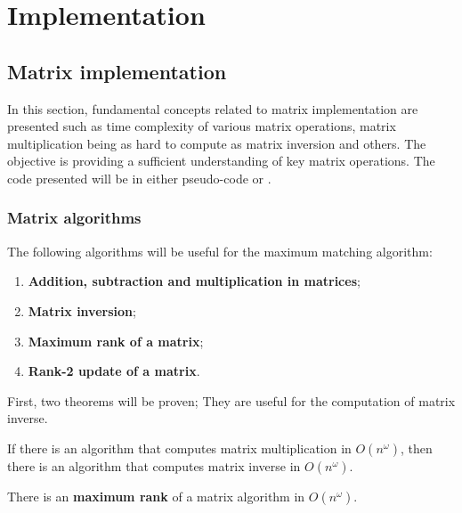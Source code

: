 \chapter{Implementation}

\section{Matrix implementation}

In this section, fundamental concepts related to matrix implementation are presented such as time complexity of various matrix operations,
matrix multiplication being as hard to compute as matrix inversion and others.
The objective is providing a sufficient understanding of key matrix operations.
The code presented will be in either pseudo-code or .

\subsection{Matrix algorithms}

The following algorithms will be useful for the maximum matching algorithm: 
\begin{enumerate}
    \item \textbf{Addition, subtraction and multiplication in matrices};
    \item \textbf{Matrix inversion};
    \item \textbf{Maximum rank of a matrix};
    \item \textbf{Rank-2 update of a matrix}.
\end{enumerate}

First, two theorems will be proven; They are useful for the computation of matrix inverse.

\begin{theorem}
    If there is an algorithm that computes matrix multiplication in \(O(n^{\omega})\), then
    there is an algorithm that computes matrix inverse in \(O(n^{\omega})\).
\end{theorem}

There is an \textbf{maximum rank} of a matrix algorithm in \(O(n^{\omega})\).
